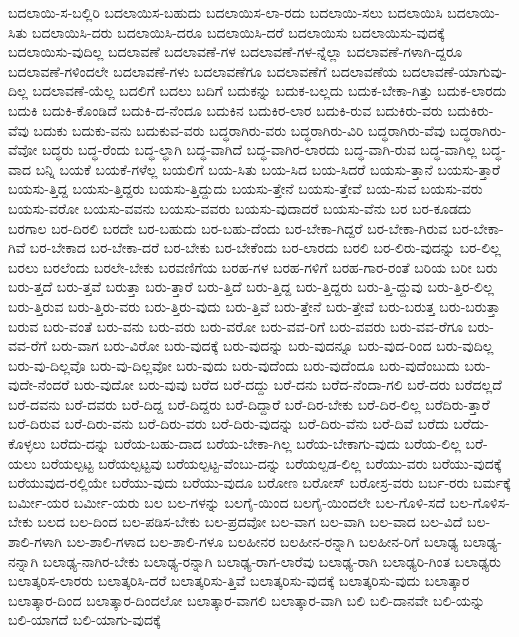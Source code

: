 {ಬದಲಾಯಿ-ಸ-ಬಲ್ಲಿರಿ
ಬದಲಾಯಿಸ-ಬಹುದು
ಬದಲಾಯಿಸ-ಲಾ-ರದು
ಬದಲಾಯಿ-ಸಲು
ಬದಲಾಯಿಸಿ
ಬದಲಾಯಿ-ಸಿತು
ಬದಲಾಯಿಸಿ-ದರು
ಬದಲಾಯಿಸಿ-ದರೂ
ಬದಲಾಯಿಸಿ-ದರೆ
ಬದಲಾಯಿಸು
ಬದಲಾಯಿಸು-ವುದಕ್ಕೆ
ಬದಲಾಯಿಸು-ವುದಿಲ್ಲ
ಬದಲಾವಣೆ
ಬದಲಾವಣೆ-ಗಳ
ಬದಲಾವಣೆ-ಗಳ-ನ್ನೆಲ್ಲಾ
ಬದಲಾವಣೆ-ಗಳಾಗಿ-ದ್ದರೂ
ಬದಲಾವಣೆ-ಗಳಿಂದಲೇ
ಬದಲಾವಣೆ-ಗಳು
ಬದಲಾವಣೆಗೂ
ಬದಲಾವಣೆಗೆ
ಬದಲಾವಣೆಯ
ಬದಲಾವಣೆ-ಯಾಗುವು-ದಿಲ್ಲ
ಬದಲಾವಣೆ-ಯೆಲ್ಲ
ಬದಲಿಗೆ
ಬದಲು
ಬದಿಗೆ
ಬದುಕನ್ನು
ಬದುಕ-ಬಲ್ಲದು
ಬದುಕ-ಬೇಕಾ-ಗಿತ್ತು
ಬದುಕ-ಲಾರದು
ಬದುಕಿ
ಬದುಕಿ-ಕೊಂಡಿದೆ
ಬದುಕಿ-ದ-ನೆಂದೂ
ಬದುಕಿನ
ಬದುಕಿರ-ಲಾರ
ಬದುಕಿ-ರುವ
ಬದುಕಿರು-ವರು
ಬದುಕಿರು-ವೆವು
ಬದುಕು
ಬದುಕು-ವನು
ಬದುಕುವ-ವರು
ಬದ್ಧರಾಗಿರು-ವರು
ಬದ್ಧರಾಗಿರು-ವಿರಿ
ಬದ್ಧರಾಗಿರು-ವೆವು
ಬದ್ಧರಾಗಿರು-ವೆವೋ
ಬದ್ಧರು
ಬದ್ಧ-ರೆಂದು
ಬದ್ಧ-ಲ್ಧಾಗಿ
ಬದ್ಧ-ವಾಗಿದೆ
ಬದ್ಧ-ವಾಗಿರ-ಲಾರದು
ಬದ್ಧ-ವಾಗಿ-ರುವ
ಬದ್ಧ-ವಾಗಿಲ್ಲ
ಬದ್ಧ-ವಾದ
ಬನ್ನಿ
ಬಯಕೆ
ಬಯಕೆ-ಗಳೆಲ್ಲ
ಬಯಲಿಗೆ
ಬಯ-ಸಿತು
ಬಯ-ಸಿದ
ಬಯ-ಸಿದರೆ
ಬಯಸು-ತ್ತಾನೆ
ಬಯಸು-ತ್ತಾರೆ
ಬಯಸು-ತ್ತಿದ್ದ
ಬಯಸು-ತ್ತಿದ್ದರು
ಬಯಸು-ತ್ತಿದ್ದುದು
ಬಯಸು-ತ್ತೇನೆ
ಬಯಸು-ತ್ತೇವೆ
ಬಯ-ಸುವ
ಬಯಸು-ವರು
ಬಯಸು-ವರೋ
ಬಯಸು-ವವನು
ಬಯಸು-ವವರು
ಬಯಸು-ವುದಾದರೆ
ಬಯಸು-ವೆನು
ಬರ
ಬರ-ಕೂಡದು
ಬರಗಾಲ
ಬರ-ದಿರಲಿ
ಬರದೇ
ಬರ-ಬಹುದು
ಬರ-ಬಹು-ದೆಂದು
ಬರ-ಬೇಕಾ-ಗಿದ್ದರೆ
ಬರ-ಬೇಕಾ-ಗಿರುವ
ಬರ-ಬೇಕಾ-ಗಿವೆ
ಬರ-ಬೇಕಾದ
ಬರ-ಬೇಕಾ-ದರೆ
ಬರ-ಬೇಕು
ಬರ-ಬೇಕೆಂದು
ಬರ-ಲಾರದು
ಬರಲಿ
ಬರ-ಲಿರು-ವುದನ್ನು
ಬರ-ಲಿಲ್ಲ
ಬರಲು
ಬರಲೆಂದು
ಬರಲೇ-ಬೇಕು
ಬರವಣಿಗೆಯ
ಬರಹ-ಗಳ
ಬರಹ-ಗಳಿಗೆ
ಬರಹ-ಗಾರ-ರಂತೆ
ಬರಿಯ
ಬರೀ
ಬರು
ಬರು-ತ್ತದೆ
ಬರು-ತ್ತವೆ
ಬರುತ್ತಾ
ಬರು-ತ್ತಾರೆ
ಬರು-ತ್ತಿದೆ
ಬರು-ತ್ತಿದ್ದ
ಬರು-ತ್ತಿದ್ದರು
ಬರು-ತ್ತಿ-ದ್ದುವು
ಬರು-ತ್ತಿರ-ಲಿಲ್ಲ
ಬರು-ತ್ತಿರುವ
ಬರು-ತ್ತಿರು-ವರು
ಬರು-ತ್ತಿರು-ವುದು
ಬರು-ತ್ತಿವೆ
ಬರು-ತ್ತೇನೆ
ಬರು-ತ್ತೇವೆ
ಬರು-ಬರುತ್ತ
ಬರು-ಬರುತ್ತಾ
ಬರುವ
ಬರು-ವಂತೆ
ಬರು-ವನು
ಬರು-ವರು
ಬರು-ವರೋ
ಬರು-ವವ-ರಿಗೆ
ಬರು-ವವರು
ಬರು-ವವ-ರೆಗೂ
ಬರು-ವವ-ರೆಗೆ
ಬರು-ವಾಗ
ಬರು-ವಿರೋ
ಬರು-ವುದಕ್ಕೆ
ಬರು-ವುದನ್ನು
ಬರು-ವುದನ್ನೂ
ಬರು-ವುದ-ರಿಂದ
ಬರು-ವುದಿಲ್ಲ
ಬರು-ವು-ದಿಲ್ಲವೊ
ಬರು-ವು-ದಿಲ್ಲವೋ
ಬರು-ವುದು
ಬರು-ವುದೆಂದು
ಬರು-ವುದೆಂದೂ
ಬರು-ವುದೆಂಬುದು
ಬರು-ವುದೇ-ನೆಂದರೆ
ಬರು-ವುದೋ
ಬರು-ವುವು
ಬರೆದ
ಬರೆ-ದದ್ದು
ಬರೆ-ದನು
ಬರೆದ-ನೆಂದಾ-ಗಲಿ
ಬರೆ-ದರು
ಬರೆದಲ್ಲದೆ
ಬರೆ-ದವನು
ಬರೆ-ದವರು
ಬರೆ-ದಿದ್ದ
ಬರೆ-ದಿದ್ದರು
ಬರೆ-ದಿದ್ದಾರೆ
ಬರೆ-ದಿರ-ಬೇಕು
ಬರೆ-ದಿರ-ಲಿಲ್ಲ
ಬರೆದಿರು-ತ್ತಾರೆ
ಬರೆ-ದಿರುವ
ಬರೆ-ದಿರು-ವನು
ಬರೆ-ದಿರು-ವರು
ಬರೆ-ದಿರು-ವುದನ್ನು
ಬರೆ-ದಿರು-ವೆನು
ಬರೆ-ದಿವೆ
ಬರೆದು
ಬರೆದು-ಕೊಳ್ಳಲು
ಬರೆದು-ದನ್ನು
ಬರೆಯ-ಬಹು-ದಾದ
ಬರೆಯ-ಬೇಕಾ-ಗಿಲ್ಲ
ಬರೆಯ-ಬೇಕಾಗು-ವುದು
ಬರೆಯ-ಲಿಲ್ಲ
ಬರೆ-ಯಲು
ಬರೆಯಲ್ಪಟ್ಟ
ಬರೆಯಲ್ಪಟ್ಟವು
ಬರೆಯಲ್ಪಟ್ಟ-ವೆಂಬು-ದನ್ನು
ಬರೆಯಲ್ಪಡ-ಲಿಲ್ಲ
ಬರೆಯು-ವರು
ಬರೆಯು-ವುದಕ್ಕೆ
ಬರೆಯುವುದ-ರಲ್ಲಿಯೇ
ಬರೆಯು-ವುದು
ಬರೆಯು-ವುದೂ
ಬರೋಣ
ಬರೋಸ್
ಬರೋಸ್ರ-ವರು
ಬರ್ಬ-ರರು
ಬರ್ಮಕ್ಕೆ
ಬರ್ಮೀ-ಯರ
ಬರ್ಮೀ-ಯರು
ಬಲ
ಬಲ-ಗಳನ್ನು
ಬಲಗೈ-ಯಿಂದ
ಬಲಗೈ-ಯಿಂದಲೇ
ಬಲ-ಗೊಳಿ-ಸದೆ
ಬಲ-ಗೊಳಿಸ-ಬೇಕು
ಬಲದ
ಬಲ-ದಿಂದ
ಬಲ-ಪಡಿಸ-ಬೇಕು
ಬಲ-ಪ್ರದವೋ
ಬಲ-ವಾಗ
ಬಲ-ವಾಗಿ
ಬಲ-ವಾದ
ಬಲ-ವಿದೆ
ಬಲ-ಶಾಲಿ-ಗಳಾಗಿ
ಬಲ-ಶಾಲಿ-ಗಳಾದ
ಬಲ-ಶಾಲಿ-ಗಳೂ
ಬಲಹೀನರ
ಬಲಹೀನ-ರನ್ನಾಗಿ
ಬಲಹೀನ-ರಿಗೆ
ಬಲಾಢ್ಯ
ಬಲಾಢ್ಯ-ನನ್ನಾಗಿ
ಬಲಾಢ್ಯ-ನಾಗಿರ-ಬೇಕು
ಬಲಾಢ್ಯ-ರನ್ನಾಗಿ
ಬಲಾಢ್ಯ-ರಾಗ-ಲಾರೆವು
ಬಲಾಢ್ಯ-ರಾಗಿ
ಬಲಾಢ್ಯರಿ-ಗಿಂತ
ಬಲಾಢ್ಯರು
ಬಲಾತ್ಕರಿಸ-ಲಾರರು
ಬಲಾತ್ಕರಿಸಿ-ದರೆ
ಬಲಾತ್ಕರಿಸು-ತ್ತಿವೆ
ಬಲಾತ್ಕರಿಸು-ವುದಕ್ಕೆ
ಬಲಾತ್ಕರಿಸು-ವುದು
ಬಲಾತ್ಕಾರ
ಬಲಾತ್ಕಾರ-ದಿಂದ
ಬಲಾತ್ಕಾರ-ದಿಂದಲೋ
ಬಲಾತ್ಕಾರ-ವಾಗಲಿ
ಬಲಾತ್ಕಾರ-ವಾಗಿ
ಬಲಿ
ಬಲಿ-ದಾನವೇ
ಬಲಿ-ಯನ್ನು
ಬಲಿ-ಯಾಗದೆ
ಬಲಿ-ಯಾಗು-ವುದಕ್ಕೆ
}
